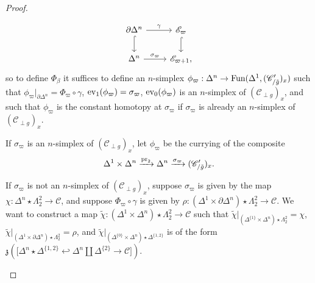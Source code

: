 \documentclass{tac}
\newcommand{\f}[1]{\mathfrak{#1}}
\newcommand{\s}[1]{\mathscr{#1}}
\newcommand{\tx}[1]{\textnormal{#1}}
\begin{document}
\begin{proof}
\begin{itemize}
\[\begin{tikzcd}
\partial \Delta^n \arrow[hook]{d} \arrow[]{r}{\gamma} & \s{E}_{\varpi} \arrow[hook]{d} \\
\Delta^n \arrow[]{r}{\sigma_{\varpi}} & \s{E}_{\varpi +1},
\end{tikzcd}\]
so to define $\Phi_{\beta}$ it suffices to define an $n$-simplex $\phi_{\varpi} : \Delta^n \to \tx{Fun}(\Delta^1 , (\s{C}'_{/ \tilde{g}})_x)$ such that $\phi_{\varpi} |_{\partial \Delta^n} = \Phi_\varpi \circ \gamma$, $\tx{ev}_1 (\phi_{\varpi}) = \sigma_\varpi$, $\tx{ev}_0 (\phi_{\varpi})$ is an $n$-simplex of $(\s{C}_{\perp g})_x$, and such that $\phi_{\varpi}$ is the constant homotopy at $\sigma_\varpi$ if $\sigma_\varpi$ is already an $n$-simplex of $(\s{C}_{\perp g})_x$.

If $\sigma_\varpi$ is an $n$-simplex of $(\s{C}_{\perp g})_x$, let $\phi_{\varpi}$ be the currying of the composite
\[ \Delta^1 \times \Delta^n \xrightarrow{\tx{pr}_2} \Delta^n \xrightarrow{\sigma_\varpi} (\s{C}'_{/\tilde{g}})_x . \]

If  $\sigma_\varpi$ is not an $n$-simplex of $(\s{C}_{\perp g})_x$, suppose $\sigma_{\varpi}$ is given by the map $\chi : \Delta^n \star \Lambda^2_2 \to \s{C}$, and suppose $\Phi_\varpi \circ \gamma$ is given by $\rho : (\Delta^1 \times \partial \Delta^n) \star \Lambda^2_2 \to \s{C}$.  We want to construct a map $\tilde{\chi} : (\Delta^1 \times \Delta^n) \star \Lambda^2_2 \to \s{C}$ such that $\tilde{\chi}|_ {(\Delta^{\{1\}} \times \Delta^n )\star \Lambda^2_2} = \chi$, $\tilde{\chi}|_{(\Delta^{1} \times \partial \Delta^n )\star \Lambda^2_2} = \rho$, and $\tilde{\chi}|_ {(\Delta^{\{0\}} \times \Delta^n )\star \Delta^{\{ 1,2 \}}}$ is of the form $\f{z}  \left( \big[ \Delta^n \star \Delta^{\{1,2 \}} \hookleftarrow \Delta^n \coprod \Delta^{\{2 \}} \to \s{C}   \big]  \right)$. 


\end{itemize}
\end{proof}
\end{document}
